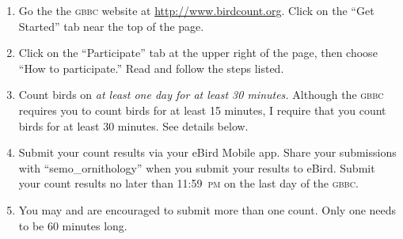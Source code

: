 \documentclass[11pt]{article}
\begin{document}
\begin{enumerate}
	\item Go the the \textsc{gbbc} website at \url{http://www.birdcount.org}. Click on the “Get Started” tab near the top of the page.

	\item Click on the “Participate” tab at the upper right of the page, then choose “How to participate.” Read and follow the steps listed.
	
	  
	
	
	
	\item Count birds on \emph{at least one day for at least 30 minutes.} Although the \textsc{gbbc} requires you to count birds for at least 15 minutes, I require that you count birds for at least 30 minutes. See details below.

	\item Submit your count results via your eBird Mobile app. Share your submissions with “semo\_ornithology” when you submit your results to eBird. Submit your count results no later than 11:59~\textsc{pm} on the last day of the \textsc{gbbc}.
	
	
	\item You may and are encouraged to submit more than one count. Only one needs to be 60 minutes long.
    
\end{enumerate}
\end{document}

